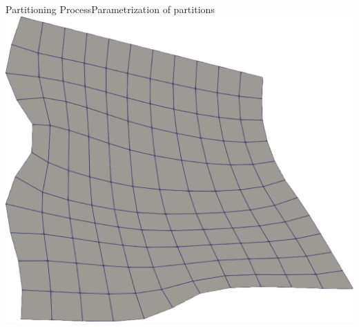 \documentclass[compress,10pt,aspectratio=169]{beamer}
\begin{document}
\begin{frame}{Partitioning Process}{Parametrization of partitions}
{\includegraphics[scale=0.1]{images/quad_equation_4.pdf}
}



\end{frame}
\end{document}

